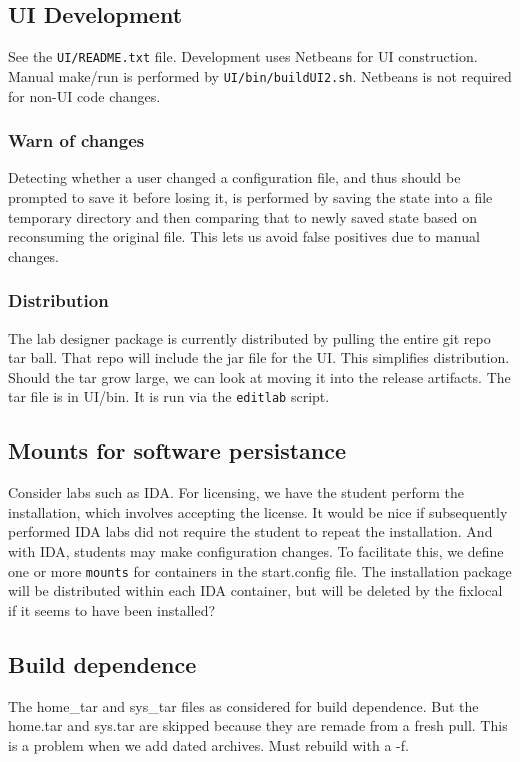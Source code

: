 \documentclass[12pt]{article}
\begin{document}
\subsection{UI Development}
See the {\tt UI/README.txt} file.  Development uses Netbeans for UI construction.  Manual make/run is performed by
{\tt UI/bin/buildUI2.sh}.  Netbeans is not required for non-UI code changes.  
\subsubsection{Warn of changes}
Detecting whether a user changed a configuration file, and thus should be prompted to save it before losing it,
is performed by saving the state into a file temporary directory and then comparing that to newly saved state based
on reconsuming the original file.  This lets us avoid false positives due to manual changes.

\subsubsection{Distribution}
The lab designer package is currently distributed by pulling the entire git repo tar ball.
That repo will include the jar file for the UI.  This simplifies distribution.  Should the tar grow large, we
can look at moving it into the release artifacts.  The tar file is in UI/bin.  It is run via the {\tt editlab}
script.

\subsection {Mounts for software persistance}
Consider labs such as IDA.  For licensing, we have the student perform the installation, which involves accepting
the license.  It would be nice if subsequently performed IDA labs did not require the student to repeat
the installation.  And with IDA, students may make configuration changes.  To facilitate this, we define
one or more {\tt mounts} for containers in the start.config file.  The installation package will be distributed
within each IDA container, but will be deleted by the fixlocal if it seems to have been installed?


\subsection {Build dependence}
The home\_tar and sys\_tar files as considered for build dependence.  But the home.tar and sys.tar are skipped because they are remade
from a fresh pull.  This is a problem when we add dated archives.  Must rebuild with a -f.
\end{document}
